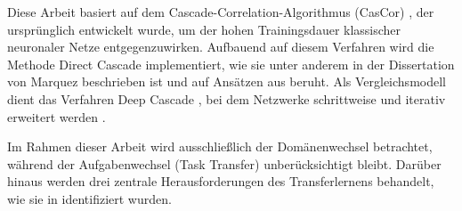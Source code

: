Diese Arbeit basiert auf dem Cascade-Correlation-Algorithmus (CasCor) \cite{cascor}, der ursprünglich entwickelt wurde, um der hohen 
Trainingsdauer klassischer neuronaler Netze entgegenzuwirken. Aufbauend auf diesem Verfahren wird die Methode Direct Cascade implementiert, 
wie sie unter anderem in der Dissertation von Marquez \cite{phd_deep_cascade} beschrieben ist und auf Ansätzen aus 
\cite{cascade_network_architectures} beruht. Als Vergleichsmodell dient das Verfahren Deep Cascade \cite{deep_cascade_learning}, bei dem 
Netzwerke schrittweise und iterativ erweitert werden \cite{Constructive_Cascade}.

Im Rahmen dieser Arbeit wird ausschließlich der Domänenwechsel betrachtet, während der Aufgabenwechsel (Task Transfer) \cite{transfer_learning} 
unberücksichtigt bleibt. Darüber hinaus werden drei zentrale Herausforderungen des Transferlernens behandelt, wie sie in \cite{survey_transfer} 
identifiziert wurden. \\

